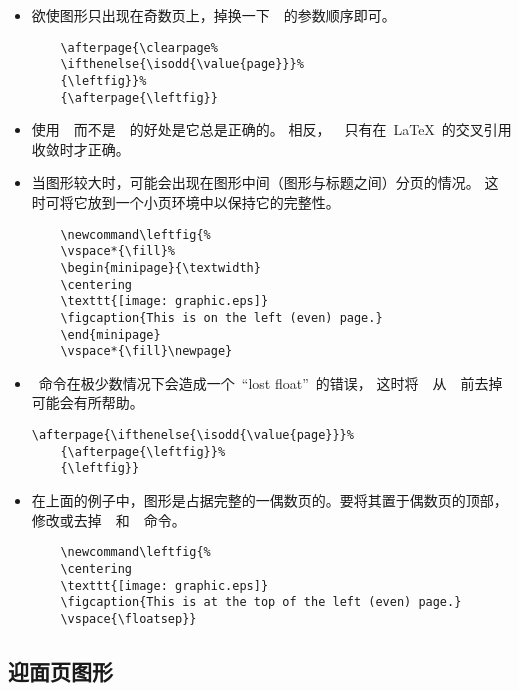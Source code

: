 \begin{itemize}
	\item 欲使图形只出现在奇数页上，掉换一下~~的参数顺序即可。
	\begin{Verbatim}
	\afterpage{\clearpage% 
	\ifthenelse{\isodd{\value{page}}}% 
	{\leftfig}}%
	{\afterpage{\leftfig}}
	\end{Verbatim}
	\item 使用~~而不是~~的好处是它总是正确的。
	相反，~~只有在~\LaTeX{}~的交叉引用收敛时才正确。
	\item 当图形较大时，可能会出现在图形中间（图形与标题之间）分页的情况。
	这时可将它放到一个小页环境中以保持它的完整性。
	\begin{Verbatim}
	\newcommand\leftfig{% 
	\vspace*{\fill}% 
	\begin{minipage}{\textwidth} 
	\centering 
	\texttt{[image: graphic.eps]} 
	\figcaption{This is on the left (even) page.} 
	\end{minipage} 
	\vspace*{\fill}\newpage}
	\end{Verbatim}
	\item {}~命令在极少数情况下会造成一个~``lost float''~的错误，
	这时将~~从~~前去掉可能会有所帮助。
	\begin{Verbatim}[xleftmargin=1cm]
	\afterpage{\ifthenelse{\isodd{\value{page}}}% 
	{\afterpage{\leftfig}}% 
	{\leftfig}}
	\end{Verbatim}
	\item 在上面的例子中，图形是占据完整的一偶数页的。要将其置于偶数页的顶部，
	修改或去掉~~和~~命令。
	\begin{Verbatim}
	\newcommand\leftfig{% 
	\centering 
	\texttt{[image: graphic.eps]} 
	\figcaption{This is at the top of the left (even) page.} 
	\vspace{\floatsep}}
	\end{Verbatim}
\end{itemize}

\subsection{迎面页图形}

